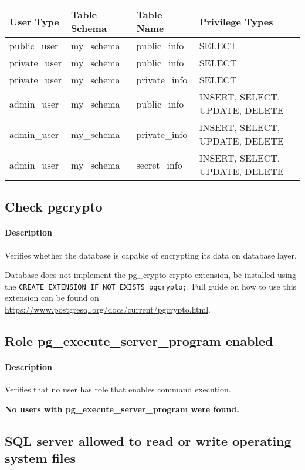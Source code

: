 \begin{tabular}{|l|l|l|l|}
\hline
\textbf{User Type} & \textbf{Table Schema} & \textbf{Table Name} & \textbf{Privilege Types} \\
\hline
public\_user & my\_schema & public\_info & SELECT \\
\hline
private\_user & my\_schema & public\_info & SELECT \\
\hline
private\_user & my\_schema & private\_info & SELECT \\
\hline
admin\_user & my\_schema & public\_info & INSERT, SELECT, UPDATE, DELETE \\
\hline
admin\_user & my\_schema & private\_info & INSERT, SELECT, UPDATE, DELETE \\
\hline
admin\_user & my\_schema & secret\_info & INSERT, SELECT, UPDATE, DELETE \\
\hline
\end{tabular}


\subsection{Check pgcrypto}
\paragraph{Description} Verifies whether the database is capable of encrypting its data on database layer.

Database does not implement the pg\_crypto crypto extension,
                                                            be installed using the \texttt{CREATE EXTENSION IF NOT EXISTS pgcrypto;}.
                                                            Full guide on how to use this extension can be found on \url{https://www.postgresql.org/docs/current/pgcrypto.html}.



\subsection{Role pg\_execute\_server\_program enabled}
\paragraph{Description} Verifies that no user has role that enables command execution.

\textbf{No users with pg\_execute\_server\_program were found.}



\subsection{SQL server allowed to read or write operating system files}
